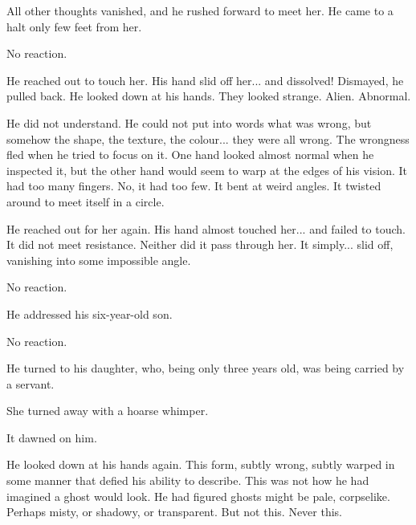 All other thoughts vanished, and he rushed forward to meet her. 
\tho{\Tiroco!} 
He came to a halt only few feet from her. 

No reaction. 


He reached out to touch her. 
His hand slid off her... and dissolved! 
Dismayed, he pulled back. 
He looked down at his hands. 
They looked strange. 
Alien. 
Abnormal. 

He did not understand. 
He could not put into words what was wrong, but somehow the shape, the texture, the colour... they were all wrong. 
The wrongness fled when he tried to focus on it. 
One hand looked almost normal when he inspected it, but the other hand would seem to warp at the edges of his vision. 
It had too many fingers. 
No, it had too few. 
It bent at weird angles. 
It twisted around to meet itself in a circle. 

He reached out for her again. 
His hand almost touched her... and failed to touch. 
It did not meet resistance. 
Neither did it pass through her. 
It simply... slid off, vanishing into some impossible angle. 


No reaction. 

He addressed his six-year-old son. 

No reaction. 

He turned to his daughter, who, being only three years old, was being carried by a servant. 


She turned away with a hoarse whimper. 

It dawned on him. 

He looked down at his hands again. 
This form, subtly wrong, subtly warped in some manner that defied his ability to describe. 
This was not how he had imagined a ghost would look. 
He had figured ghosts might be pale, corpselike. 
Perhaps misty, or shadowy, or transparent. 
But not this. 
Never this. 


